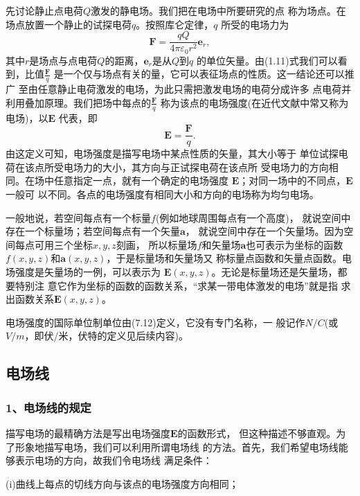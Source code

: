 先讨论静止点电荷$Q$激发的静电场。我们把在电场中所要研究的点
称为场点。在场点放置一个静止的试探电荷$q$。按照库仑定律，$q$
所受的电场力为
\begin{equation}
    \boldsymbol{F}=\frac{qQ}{4\pi \varepsilon_0 r^2}\boldsymbol{e}_r,
\end{equation}
其中$r$是场点与点电荷$Q$的距离，$\boldsymbol{e}_r$是从$Q$到$q$
的单位矢量。由(1.11)式我们可以看到，比值$\frac{\boldsymbol{F}}{q}$
是一个仅与场点有关的量，它可以表征场点的性质。这一结论还可以推广
至由任意静止电荷激发的电场，为此只需把激发电场的电荷分成许多
点电荷并利用叠加原理。我们把场中每点的$\frac{\boldsymbol{F}}{q}$
称为该点的电场强度(在近代文献中常又称为电场)，以$\boldsymbol{E}$
代表，即 
\begin{equation}
    \boldsymbol{E}=\frac{\boldsymbol{F}}{q}.
\end{equation}
由这定义可知，电场强度是描写电场中某点性质的矢量，其大小等于
单位试探电荷在该点所受电场力的大小，其方向与正试探电荷在该点所
受电场力的方向相同。在场中任意指定一点，就有一个确定的电场强度
$\boldsymbol{E}$；对同一场中的不同点，$\boldsymbol{E}$一般可
以不同。各点的电场强度有相同大小和方向的电场称为均匀电场。

一般地说，若空间每点有一个标量$f$(例如地球周围每点有一个高度)，
就说空间中存在一个标量场；若空间每点有一个矢量$\boldsymbol{a}$，
就说空间中存在一个矢量场。因为空间每点可用三个坐标$x,y,z$刻画，
所以标量场$f$和矢量场$\boldsymbol{a}$也可表示为坐标的函数
$f(x,y,z)$和$\boldsymbol{a}(x,y,z)$，于是标量场和矢量场又
称标量点函数和矢量点函数。电场强度是矢量场的一例，可以表示为
$\boldsymbol{E}(x,y,z)$。无论是标量场还是矢量场，都要特别注
意它作为坐标的函数的函数关系，“求某一带电体激发的电场”就是指
求出函数关系$\boldsymbol{E}(x,y,z)$。

电场强度的国际单位制单位由(7.12)定义，它没有专门名称，一
般记作$N/C$(或$V/m$，即伏/米，伏特的定义见后续内容)。
\subsection{电场线}
\subsubsection*{1、电场线的规定}
描写电场的最精确方法是写出电场强度$\boldsymbol{E}$的函数形式，
但这种描述不够直观。为了形象地描写电场，我们可以利用所谓电场线
的方法。首先，我们希望电场线能够表示电场的方向，故我们令电场线
满足条件：

(i)曲线上每点的切线方向与该点的电场强度方向相同；


